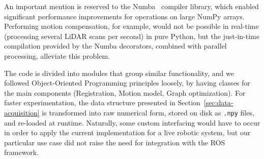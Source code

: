 An important mention is reserved to the Numba~\cite{numba} compiler library, which enabled significant performance improvements for operations on large NumPy arrays. Performing motion compensation, for example, would not be possible in real-time (\ie processing several LiDAR scans per second) in pure Python, but the just-in-time compilation provided by the Numba decorators, combined with parallel processing, alleviate this problem.

The code is divided into modules that group similar functionality, and we followed Object-Oriented Programming principles loosely, by having classes for the main components (\eg Registration, Motion model, Graph optimization). For faster experimentation, the data structure presented in Section~\ref{sec:data-acquisition} is transformed into raw numerical form, stored on disk as \texttt{.npy} files, and re-loaded at runtime. Naturally, some custom interfacing would have to occur in order to apply the current implementation for a live robotic system, but our particular use case did not raise the need for integration with the ROS~\cite{ros2009} framework.

